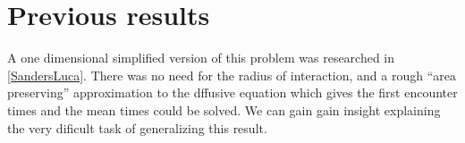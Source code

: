 \documentclass[letterpaperr,12pt]{article}
\begin{document}
\section{Previous results}

A one dimensional  simplified version of this problem was researched 
in \ref{SandersLuca}. There was no need for the radius of interaction,
and a rough ``area preserving'' approximation to the dffusive equation
which gives the first encounter times and the mean times could be solved.
We can gain gain insight explaining the very dificult task of generalizing
this result. 
\end{document}
